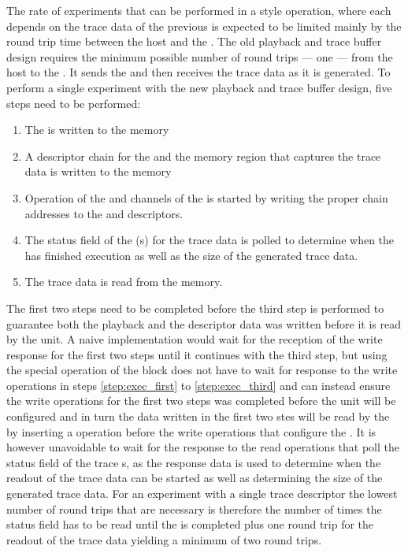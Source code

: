 The rate of experiments that can be performed in a \HWinTheLoop{} style operation, where each \PlaybackProgram{} depends on the trace data of the previous \PlaybackProgram{} is expected to be limited mainly by the round trip time between the host and the \FPGA{}. The old playback and trace buffer design requires the minimum possible number of round trips --- one --- from the host to the \FPGA{}. It sends the \PlaybackProgram{} and then receives the trace data as it is generated.
To perform a single experiment with the new playback and trace buffer design, five steps need to be performed:
\begin{enumerate}
    \item\label{step:exec_first} The \PlaybackProgram{} is written to the \DDR{} memory
    \item A descriptor{} chain for the \PlaybackProgram{} and the memory region that captures the trace data is written to the \descriptor{} memory
    \item\label{step:exec_third} Operation of the \SToMM{} and \MMToS{} channels of the \AXIDMA{} is started by writing the proper \descriptor{} chain addresses to the \curdesc{} and \taildesc{} descriptors.
    \item The status field of the \descriptor{}(s) for the trace data is polled to determine when the \PlaybackProgram{} has finished execution as well as the size of the generated trace data.
    \item The trace data is read from the \DDR{} memory.
\end{enumerate}
The first two steps need to be completed before the third step is performed to guarantee both the playback and the descriptor data was written before it is read by the \AXIDMA{} unit.
A naive implementation would wait for the reception of the write response for the first two steps until it continues with the third step, but using the special \globalfence{} operation of the \FAXI{} block \ayo{} does not have to wait for response to the write operations in steps \autoref{step:exec_first} to \autoref{step:exec_third} and can instead ensure the write operations for the first two steps was completed before the \AXIDMA{} unit will be configured and in turn the data written in the first two stes will be read by the \AXIDMA{} by inserting a \globalfence{} operation before the write operations that configure the \AXIDMA{}. It is however unavoidable to wait for the response to the read operations that poll the status field of the trace \descriptor{}s, as the response data is used to determine when the readout of the trace data can be started as well as determining the size of the generated trace data. For an experiment with a single trace descriptor the lowest number of round trips that are necessary is therefore the number of times the status field has to be read until the \PlaybackProgram{} is completed plus one round trip for the readout of the trace data yielding a minimum of two round trips.
